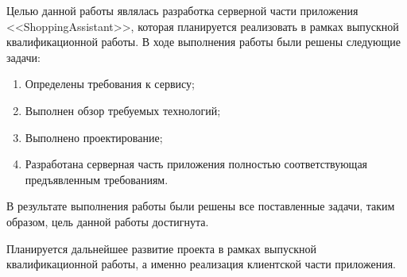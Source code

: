 Целью данной работы являлась разработка серверной части приложения <<ShoppingAssistant>>, которая планируется реализовать в рамках выпускной квалификационной работы.
В ходе выполнения работы были решены следующие задачи:
\begin{enumerate}
	\item Определены требования к сервису;
	\item Выполнен обзор требуемых технологий;
	\item Выполнено проектирование;
	\item Разработана серверная часть приложения полностью соответствующая предъявленным требованиям.
\end{enumerate}
В результате выполнения работы были решены все поставленные задачи, таким образом, цель данной работы достигнута.

Планируется дальнейшее развитие проекта в рамках выпускной квалификационной работы, а именно реализация клиентской части приложения.

\clearpage